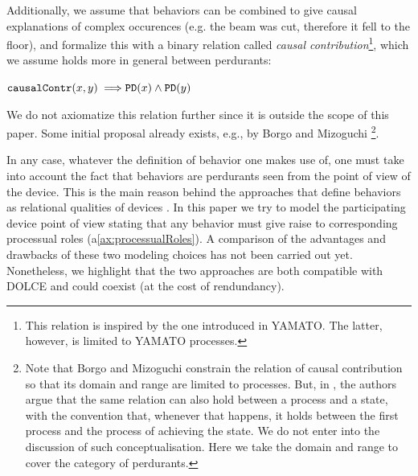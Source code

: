 \documentclass[sw]{iosart2x}
\newcommand{\bflist}{\begin{list}{}{\setlength{\topsep}{2mm}\setlength{\partopsep}{0mm}\setlength{\parsep}{0mm}\setlength{\leftmargin}{9mm}\setlength{\labelwidth}{8mm}}}
\newcommand{\eflist}{\end{list}}
\newcommand{\AxLabel}{\textrm{a}}
\newcounter{cntax}
\newcommand{\myax}[1]{\refstepcounter{cntax}\begin{small}{\bf \AxLabel\thecntax\label{ax:#1}}\end{small}}
\newcommand{\refax}[1]{({\AxLabel}\ref{#1})}
\newcommand{\generalStyle}[1]{\texttt{#1}}
\newcommand{\biRel}[3]{\generalStyle{#1}(#2,#3)}
\newcommand{\uniRel}[2]{\generalStyle{#1}(#2)}
\newcommand{\myfi}{\hspace{0.9mm} \Longrightarrow}
\newcommand{\DOLCE}{\textsc{DOLCE}\xspace} %
\newcommand{\YAMATO}{\textsc{YAMATO}\xspace}
\newcommand{\DOLCEPerdurant}[1]{\uniRel{{PD}}{#1}}
\newcommand{\causallyContr}[2]{\biRel{causalContr}{#1}{#2}}
\newcommand{\firstTimeKeyWord}[1]{\textit{#1}}
\begin{document}
Additionally, we assume that behaviors can be combined to give causal explanations of complex occurences (e.g. the beam was cut, therefore it fell to the floor), and formalize this with a binary relation called \firstTimeKeyWord{causal contribution}\footnote{This relation is inspired by the one introduced in \YAMATO \cite{mizoguchiYAMATOAnotherMore}. The latter, however, is limited to \YAMATO processes.}, which we assume holds more in general between perdurants:
\bflist
  \item[\myax{contribRange}] $ \causallyContr{x}{y} \myfi \DOLCEPerdurant{x} \land \DOLCEPerdurant{y} $
\eflist

We do not axiomatize this relation further since it is outside the scope of this paper. Some initial proposal already exists, e.g., by Borgo and Mizoguchi \cite{borgoFirstorderFormalizationEvent2014}\footnote{Note that Borgo and Mizoguchi constrain the relation of causal contribution so that its domain and range are limited to processes. But, in \cite{mizoguchiUnifyingDefinitionArtifact2016}, the authors argue that the same relation can also hold between a process and a state, with the convention that, whenever that happens, it holds between the first process and the process of achieving the state.
We do not enter into the discussion of such conceptualisation. Here we take the domain and range to cover the category of perdurants.}.

In any case, whatever the definition of behavior one makes use of, one must take into account the fact that behaviors are perdurants seen from the point of view of the device. This is the main reason behind the approaches that define behaviors as relational qualities of devices \cite{borgoFormalOntologicalPerspective2009}. In this paper we try to model the participating device point of view stating that any behavior must give raise to corresponding processual roles \refax{ax:processualRoles}. A comparison of the advantages and drawbacks of these two modeling choices has not been carried out yet. Nonetheless, we highlight that the two approaches are both compatible with \DOLCE and could coexist (at the cost of rendundancy).
\end{document}
